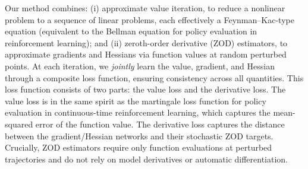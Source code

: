 \documentclass[twoside,11pt]{article}
\newcommand{\1}{\mathbf{1}}
\numberwithin{equation}{section}
\begin{document}
Our method combines:
(i) approximate value iteration, to reduce a nonlinear problem to a sequence of linear problems, each effectively a Feynman--Kac-type equation (equivalent to the Bellman equation for policy evaluation in reinforcement learning); and (ii) zeroth-order derivative (ZOD) estimators, to approximate gradients and Hessians via function values at random perturbed points. At each iteration, we {\it jointly} learn the value, gradient, and Hessian through a composite loss function, ensuring consistency across all quantities. This loss function consists of two parts: the value loss and the derivative loss. The value loss is in the same spirit as the martingale loss function \citep{jia2022policy} for policy evaluation in continuous-time reinforcement learning, which captures the mean-squared error of the function value. The derivative loss captures the distance between the gradient/Hessian networks and their stochastic ZOD targets. Crucially, ZOD estimators require only function evaluations at perturbed trajectories and do not rely on model derivatives or automatic differentiation.
\end{document}
